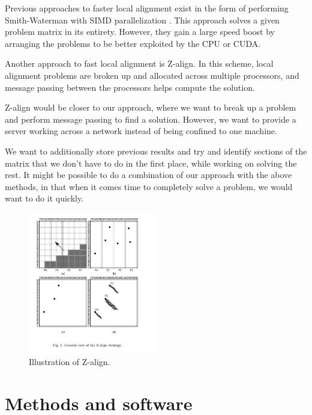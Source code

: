 \documentclass[12pt]{article}
\begin{document}
Previous approaches to faster local alignment exist in the form of performing Smith-Waterman with SIMD parallelization \cite{Rognes:11}. This approach solves a given problem matrix in its entirety. However, they gain a large speed boost by arranging the problems to be better exploited by the CPU or CUDA. 

Another approach to fast local alignment is Z-align\cite{Rognes:11}. In this scheme, local alignment problems are broken up and allocated across multiple processors, and message passing between the processors helps compute the solution.

Z-align would be closer to our approach, where we want to break up a problem and perform message passing to find a solution. However, we want to provide a server working across a network instead of being confined to one machine.  

We want to additionally store previous results and try and identify sections of the matrix that we don't have to do in the first place, while working on solving the rest. It might be possible to do a combination of our approach with the above methods, in that when it comes time to completely solve a problem, we would want to do it quickly.

\begin{figure}
  \centering 
  \includegraphics[width=0.5\textwidth]{ExistingWorkAllocationStrategies}
  \caption{Illustration of Z-align.\cite{Rognes:11}}
  \label{fig:z-align}
\end{figure}



\section{Methods and software}
\end{document}
